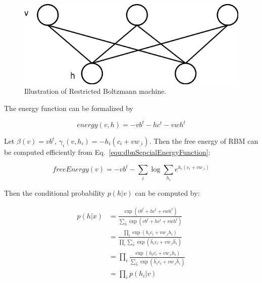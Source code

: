 \documentclass[runningheads,openany]{xhlPaper}
\begin{document}
\begin{figure}
\centering
\includegraphics[width=0.6\linewidth]{dbn_rbm}
\caption{Illustration of Restricted Boltzmann machine.}
\label{fig:dbn_rbm}
\end{figure}

The energy function can be formalized by

\begin{displaymath}
\label{equ:dbn_rbm_energy}
energy\left( {v,h} \right) =  - v{b^t} - h{c^t} - vw{h^t}
\end{displaymath}

Let $\beta \left( v \right) = v{b^t}$, ${\gamma _i}\left( {v,{h_i}} \right) =  - {h_i}\left( {{c_i} + v{w_{\_i}}} \right)$.
Then the free energy of RBM can be computed efficiently from Eq.~\ref{equ:dbnSepcialEnergyFunction}:

\begin{displaymath}
\label{equ:dbn_rbm_free_energy}
freeEnergy\left( v \right) =  - v{b^t} - \sum\limits_i {\log \sum\limits_{{h_i}} {{e^{{h_i}\left( {{c_i} + v{w_{\_i}}} \right)}}} }
\end{displaymath}

Then the conditional probability $p\left(h|v\right)$ can be computed by:

\begin{equation}
\label{equ:dbn_rbn_conditional_probability}
\begin{aligned}
p\left( {h|x} \right) &= \frac{{\exp \left( {v{b^t} + h{c^t} + vw{h^t}} \right)}}{{\sum\limits_{\hat h} {\exp \left( {v{b^t} + h{c^t} + vw{h^t}} \right)} }}\\
 &= \frac{{\prod\limits_i {\exp \left( {{h_i}{c_i} + v{w_{\_i}}{h_i}} \right)} }}{{\prod\limits_i {\sum\limits_{\hat h} {\exp \left( {{{\hat h}_i}{c_i} + v{w_{\_i}}{{\hat h}_i}} \right)} } }}\\
 &= \prod\limits_i {\frac{{\exp \left( {{h_i}{c_i} + v{w_{\_i}}{h_i}} \right)}}{{\sum\limits_{\hat h} {\exp \left( {{{\hat h}_i}{c_i} + v{w_{\_i}}{{\hat h}_i}} \right)} }}} \\
 &= \prod\limits_i {p\left( {{h_i}|v} \right)} 
\end{aligned}
\end{equation}
\end{document}
